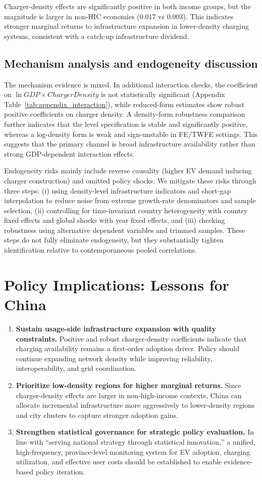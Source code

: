 \documentclass[a4paper,12pt]{article}
\begin{document}
Charger-density effects are significantly positive in both income groups, but the magnitude is larger in non-HIC economies (0.017 vs 0.003). This indicates stronger marginal returns to infrastructure expansion in lower-density charging systems, consistent with a catch-up infrastructure dividend.

\subsection{Mechanism analysis and endogeneity discussion}
The mechanism evidence is mixed. In additional interaction checks, the coefficient on $\ln GDP\times ChargerDensity$ is not statistically significant (Appendix Table~\ref{tab:appendix_interaction}), while reduced-form estimates show robust positive coefficients on charger density. A density-form robustness comparison further indicates that the level specification is stable and significantly positive, whereas a log-density form is weak and sign-unstable in FE/TWFE settings. This suggests that the primary channel is broad infrastructure availability rather than strong GDP-dependent interaction effects.

Endogeneity risks mainly include reverse causality (higher EV demand inducing charger construction) and omitted policy shocks. We mitigate these risks through three steps: (i) using density-level infrastructure indicators and short-gap interpolation to reduce noise from extreme growth-rate denominators and sample selection, (ii) controlling for time-invariant country heterogeneity with country fixed effects and global shocks with year fixed effects, and (iii) checking robustness using alternative dependent variables and trimmed samples. These steps do not fully eliminate endogeneity, but they substantially tighten identification relative to contemporaneous pooled correlations.

\section{Policy Implications: Lessons for China}
\begin{enumerate}
    \item \textbf{Sustain usage-side infrastructure expansion with quality constraints.} Positive and robust charger-density coefficients indicate that charging availability remains a first-order adoption driver. Policy should continue expanding network density while improving reliability, interoperability, and grid coordination.
    \item \textbf{Prioritize low-density regions for higher marginal returns.} Since charger-density effects are larger in non-high-income contexts, China can allocate incremental infrastructure more aggressively to lower-density regions and city clusters to capture stronger adoption gains.
    \item \textbf{Strengthen statistical governance for strategic policy evaluation.} In line with ``serving national strategy through statistical innovation,'' a unified, high-frequency, province-level monitoring system for EV adoption, charging utilization, and effective user costs should be established to enable evidence-based policy iteration.
\end{enumerate}
\end{document}
